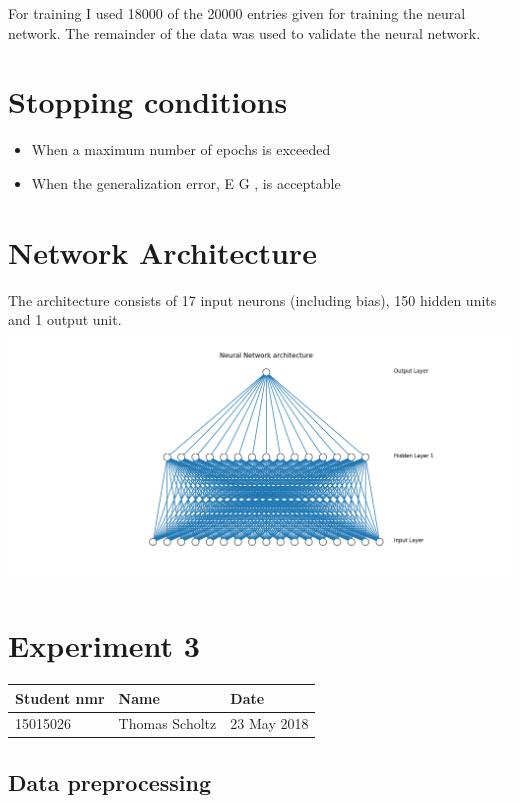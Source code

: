 \documentclass[11pt]{article}
\makeatletter
\def\maxwidth{\ifdim\Gin@nat@width>\linewidth\linewidth
    \else\Gin@nat@width\fi}
\let\Oldincludegraphics\includegraphics
\renewcommand{\includegraphics}[1]{\Oldincludegraphics[width=.8\maxwidth]{#1}}
\providecommand{\tightlist}{%
      \setlength{\itemsep}{0pt}\setlength{\parskip}{0pt}}
\makeatother
\begin{document}
For training I used 18000 of the 20000 entries given for training the
neural network. The remainder of the data was used to validate the
neural network.

\hypertarget{stopping-conditions}{%
\section{Stopping conditions}\label{stopping-conditions}}

\begin{itemize}
\tightlist
\item
  When a maximum number of epochs is exceeded
\item
  When the generalization error, E G , is acceptable
\end{itemize}

\hypertarget{network-architecture}{%
\section{Network Architecture}\label{network-architecture}}

The architecture consists of 17 input neurons (including bias), 150
hidden units and 1 output unit. \includegraphics{Experiment2NN.png}

    \hypertarget{experiment-3}{%
\section{Experiment 3}\label{experiment-3}}

\begin{longtable}[]{@{}lll@{}}
\toprule
Student nmr & Name & Date\tabularnewline
\midrule
\endhead
15015026 & Thomas Scholtz & 23 May 2018\tabularnewline
\bottomrule
\end{longtable}

    \hypertarget{data-preprocessing}{%
\subsection{Data preprocessing}\label{data-preprocessing}}
\end{document}
